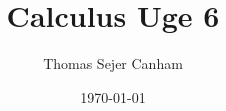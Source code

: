 \documentclass{article}
\title{Calculus Uge 6}
\author{Thomas Sejer Canham}
\date{\today}
\begin{document}
\begin{titlepage}
 \maketitle
 \thispagestyle{empty}
\end{titlepage}
\end{document}
